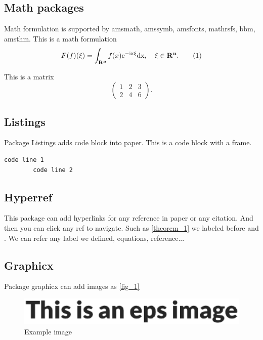 \documentclass{article}
\begin{document}
    \subsection{Math packages}
    Math formulation is supported by amsmath, amssymb, amsfonts, mathrsfs, bbm, amsthm.
    This is a math formulation
    \begin{align}
        F(f)(\xi)=\int_{\bf{R}^n} f(x)\rm e^{-\rm i x\xi}\rm dx,\quad \xi\in\bf{R}^n. \tag{1}
    \end{align}

    This is a matrix
    $$
    \begin{pmatrix}
        1 & 2 & 3\\
        2 & 4 & 6
    \end{pmatrix}.
    $$
    
    \subsection{Listings}
    Package Listings adds code block into paper.
    This is a code block with a frame.
    \begin{lstlisting}[frame = single]
        code line 1
        code line 2
    \end{lstlisting}

    \subsection{Hyperref}
    This package can add hyperlinks for any reference in paper or any citation. And then you can click any ref to navigate.
    Such as \autoref{theorem_1} we labeled before and \cite{referencekey}. We can refer any label we defined, equations, reference...

    \subsection{Graphicx}
    Package graphicx can add images as \autoref{fig_1}

    \begin{figure}[htbp] %
        \centering %
        \includegraphics[width=\linewidth]{example.eps} 
        \caption{Example image} %
        \label{fig_1}
    \end{figure}
    
\end{document}
